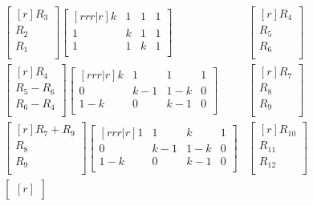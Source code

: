 \documentclass{report}
\begin{document}
\begin{enumerate}
\begin{enumerate}
\begin{enumerate}
\begin{align*}
\begin{bmatrix}[r]
		R_3\\ R_2\\ R_1\\
		\end{bmatrix}
		\begin{bmatrix}[rrr|r]
		k & 1 & 1 & 1\\
		1 & k & 1 & 1\\
		1 & 1 & k & 1\\
		\end{bmatrix}&
		\begin{bmatrix}[r]
		R_4\\ R_5\\ R_6\\
		\end{bmatrix}\\
		\begin{bmatrix}[r]
		R_4\\		
		R_5 - R_6\\
		R_6 - R_4\\
		\end{bmatrix}
		\begin{bmatrix}[rrr|r]
		k & 1 & 1 & 1\\
		0 & k-1 & 1-k & 0\\
		1-k & 0 & k-1 & 0\\
		\end{bmatrix}&
		\begin{bmatrix}[r]
		R_7\\ R_8\\ R_9\\
		\end{bmatrix}\\
		\begin{bmatrix}[r]
		R_7 + R_9\\
		R_8\\
		R_9\\
		\end{bmatrix}
		\begin{bmatrix}[rrr|r]
		1 & 1 & k & 1\\
		0 & k-1 & 1-k & 0\\
		1-k & 0 & k-1 & 0\\
		\end{bmatrix}&
		\begin{bmatrix}[r]
		R_{10}\\ R_{11}\\ R_{12}\\
		\end{bmatrix}\\
		\begin{bmatrix}[r]

\end{bmatrix}
\end{align*}
\end{enumerate}
\end{enumerate}
\end{enumerate}
\end{document}
